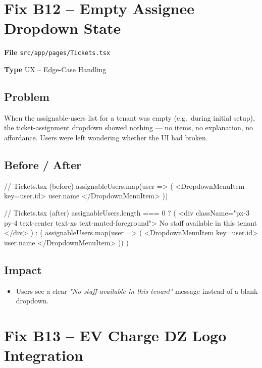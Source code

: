 \documentclass[12pt,a4paper]{report}
\newcommand{\diffL}{\noindent\begin{minipage}[t]{0.485\linewidth}}
\newcommand{\diffR}{\end{minipage}\hfill\begin{minipage}[t]{0.485\linewidth}}
\newcommand{\diffend}{\end{minipage}\par\smallskip}
\newcommand{\inforow}[2]{%
	\noindent
	\begin{tcolorbox}[
		colback   = lightblue,
		colframe  = midblue,
		arc       = 2pt,
		left      = 6pt, right = 6pt, top = 2pt, bottom = 2pt,
		sidebyside, sidebyside align = top seam,
		lefthand width = 3.2cm,
		segmentation hidden,
		]
		\textbf{\color{brandblue}\small #1}
		\tcblower
		{\small\color{labelgray} #2}
	\end{tcolorbox}\vspace{2pt}%
}
\newcommand{\file}[1]{\texttt{\small #1}}
\begin{document}
	\section{Fix B12 -- Empty Assignee Dropdown State}

	\inforow{File}{\file{src/app/pages/Tickets.tsx}}
	\inforow{Type}{UX -- Edge-Case Handling}

	\subsection*{Problem}

	When the assignable-users list for a tenant was empty (e.g.\ during
	initial setup), the ticket-assignment dropdown showed nothing --- no
	items, no explanation, no affordance. Users were left wondering
	whether the UI had broken.

	\subsection*{Before / After}

	\diffL
	\begin{beforecode}
// Tickets.tsx (before)
{assignableUsers.map(user => (
  <DropdownMenuItem key={user.id}>
    {user.name}
  </DropdownMenuItem>
))}
	\end{beforecode}
	\diffR
	\begin{aftercode}
// Tickets.tsx (after)
{assignableUsers.length === 0 ? (
  <div className="px-3 py-4
    text-center text-xs
    text-muted-foreground">
    No staff available
    in this tenant
  </div>
) : (
  assignableUsers.map(user => (
    <DropdownMenuItem key={user.id}>
      {user.name}
    </DropdownMenuItem>
  ))
)}
	\end{aftercode}
	\diffend

	\subsection*{Impact}
	\begin{itemize}
		\item Users see a clear \emph{"No staff available in this tenant"} message instead of a blank dropdown.
	\end{itemize}

	\section{Fix B13 -- EV Charge DZ Logo Integration}
\end{document}
